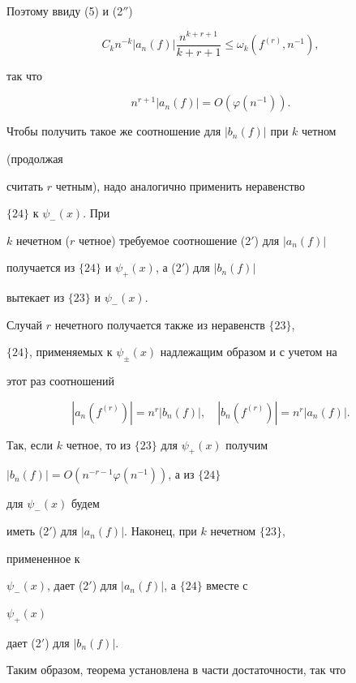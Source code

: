 Поэтому ввиду (5) и (2$''$)


$$


C_k n^{-k}|a_n(f)|\frac{n^{k+r+1}}{k+r+1}\le


\omega_k(f^{(r)},n^{-1}),


$$


так что


$$


n^{r+1}|a_n(f)|=O(\varphi(n^{-1})).


$$


Чтобы получить такое же соотношение для $|b_n(f)|$ при $k$ четном


(продолжая


считать $r$ четным), надо аналогично применить неравенство


$\{24\}$ к $\psi_-(x)$. При


$k$ нечетном ($r$ четное) требуемое соотношение (2$'$) для $|a_n(f)|$


получается из $\{24\}$ и $\psi_+(x)$, а (2$'$) для $|b_n(f)|$


вытекает из $\{23\}$ и $\psi_-(x)$.





Случай $r$ нечетного получается также из неравенств $\{23\}$,


$\{24\}$, применяемых к $\psi_\pm(x)$ надлежащим образом и с учетом на


этот раз соотношений


$$


|a_n(f^{(r)})|=n^r|b_n(f)|,\quad


|b_n(f^{(r)})|=n^r|a_n(f)|.


$$


Так, если $k$ четное, то из $\{23\}$ для $\psi_+(x)$ получим


$|b_n(f)|=O(n^{-r-1}\varphi(n^{-1}))$, а из $\{24\}$


для $\psi_-(x)$ будем


иметь (2$'$) для $|a_n(f)|$. Наконец, при $k$ нечетном $\{23\}$,


примененное к


$\psi_-(x)$, дает (2$'$) для $|a_n(f)|$, а $\{24\}$ вместе с


$\psi_+(x)$


дает (2$'$) для $|b_n(f)|$.





Таким образом, теорема установлена в части достаточности, так что


